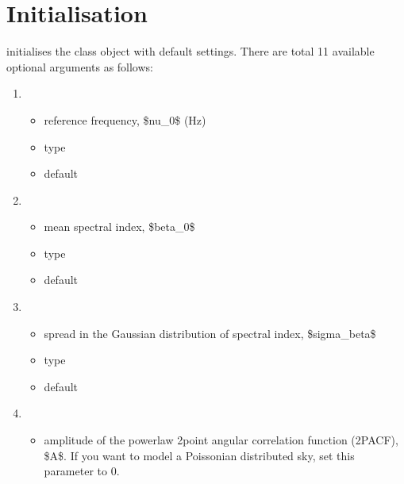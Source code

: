 \documentclass[letterpaper,10pt,english]{sphinxmanual}
\begin{document}
\section{Initialisation}
\label{\detokenize{detexp:initialisation}}
\sphinxAtStartPar
{} initialises the class object with default settings.
There are total 11 available optional arguments as follows:
\begin{enumerate}
%
\item {} 
\sphinxAtStartPar
{}
\begin{itemize}
\item {} 
\sphinxAtStartPar
reference frequency, \$nu\_0\$ (Hz)

\item {} 
\sphinxAtStartPar
type 

\item {} 
\sphinxAtStartPar
default 

\end{itemize}

\item {} 
\sphinxAtStartPar
{}
\begin{itemize}
\item {} 
\sphinxAtStartPar
mean spectral index, \$beta\_0\$

\item {} 
\sphinxAtStartPar
type 

\item {} 
\sphinxAtStartPar
default 

\end{itemize}

\item {} 
\sphinxAtStartPar
{}
\begin{itemize}
\item {} 
\sphinxAtStartPar
spread in the Gaussian distribution of spectral index,
\$sigma\_beta\$

\item {} 
\sphinxAtStartPar
type 

\item {} 
\sphinxAtStartPar
default 

\end{itemize}

\item {} 
\sphinxAtStartPar
{}
\begin{itemize}
\item {} 
\sphinxAtStartPar
amplitude of the power\sphinxhyphen{}law 2\sphinxhyphen{}point angular correlation function
(2PACF), \$A\$. If you want to model a Poissonian distributed sky,
set this parameter to 0.


\end{itemize}
\end{enumerate}
\end{document}
